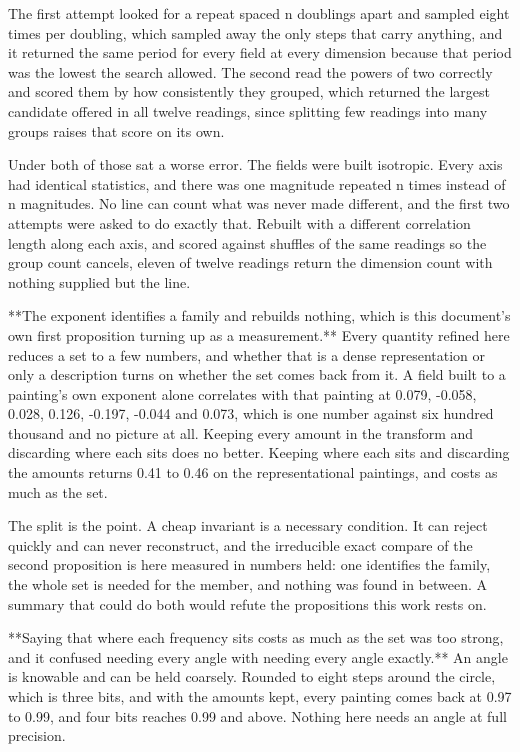 The first attempt looked for a repeat spaced n doublings apart and sampled eight times per doubling, which sampled away the only steps that carry anything, and it returned the same period for every field at every dimension because that period was the lowest the search allowed. The second read the powers of two correctly and scored them by how consistently they grouped, which returned the largest candidate offered in all twelve readings, since splitting few readings into many groups raises that score on its own.

Under both of those sat a worse error. The fields were built isotropic. Every axis had identical statistics, and there was one magnitude repeated n times instead of n magnitudes. No line can count what was never made different, and the first two attempts were asked to do exactly that. Rebuilt with a different correlation length along each axis, and scored against shuffles of the same readings so the group count cancels, eleven of twelve readings return the dimension count with nothing supplied but the line.

**The exponent identifies a family and rebuilds nothing, which is this document's own first proposition turning up as a measurement.** Every quantity refined here reduces a set to a few numbers, and whether that is a dense representation or only a description turns on whether the set comes back from it. A field built to a painting's own exponent alone correlates with that painting at 0.079, -0.058, 0.028, 0.126, -0.197, -0.044 and 0.073, which is one number against six hundred thousand and no picture at all. Keeping every amount in the transform and discarding where each sits does no better. Keeping where each sits and discarding the amounts returns 0.41 to 0.46 on the representational paintings, and costs as much as the set.

The split is the point. A cheap invariant is a necessary condition. It can reject quickly and can never reconstruct, and the irreducible exact compare of the second proposition is here measured in numbers held: one identifies the family, the whole set is needed for the member, and nothing was found in between. A summary that could do both would refute the propositions this work rests on.

**Saying that where each frequency sits costs as much as the set was too strong, and it confused needing every angle with needing every angle exactly.** An angle is knowable and can be held coarsely. Rounded to eight steps around the circle, which is three bits, and with the amounts kept, every painting comes back at 0.97 to 0.99, and four bits reaches 0.99 and above. Nothing here needs an angle at full precision.

